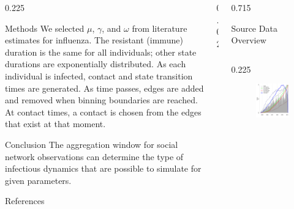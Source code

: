 \documentclass[final]{beamer} %
\newcommand{\spaceProp}{0.02}
\newcommand{\spacer}{\begin{column}{\spaceProp\paperwidth}\end{column}}
\newenvironment{oneCol}{\begin{column}[t]{0.225\paperwidth}}{\end{column}}
\newenvironment{threeCol}{\begin{column}[t]{0.715\paperwidth}}{\end{column}}
\begin{document}
\begin{frame}{}
\begin{columns}[t]
\begin{oneCol}
\begin{block}{Methods}
We selected $\mu$, $\gamma$, and $\omega$ from literature estimates for influenza.  The resistant (immune) duration is the same for all individuals; other state durations are exponentially distributed.  As each individual is infected, contact and state transition times are generated.  As time passes, edges are added and removed when binning boundaries are reached.  At contact times, a contact is chosen from the edges that exist at that moment. 
    \end{block}
    \begin{block}{Conclusion}
The aggregation window for social network observations can determine the type of infectious dynamics that are possible to simulate for given parameters.
    \end{block}
    \begin{block}{References}
      \nocite{*} %
      \small{
      \vspace{0.75in}}
    \end{block}
    \end{oneCol}
    \spacer{}
    \begin{threeCol}
    \begin{block}{Source Data Overview}
    \begin{columns}
    \begin{oneCol}
      \begin{figure}
        \includegraphics[width=1.0\linewidth]{dataReview.png}

\end{figure}
\end{oneCol}
\end{columns}
\end{block}
\end{threeCol}
\end{columns}
\end{frame}
\end{document}
